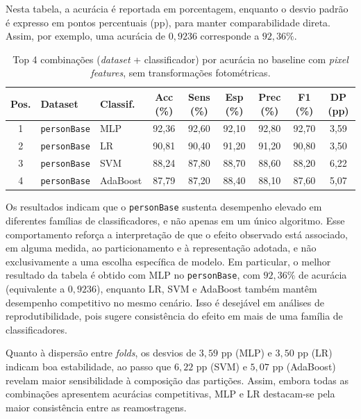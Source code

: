 \documentclass[11pt,a4paper]{article}
\begin{document}
Nesta tabela, a acurácia é reportada em porcentagem, enquanto o desvio padrão é expresso em pontos percentuais (pp), para manter comparabilidade direta. Assim, por exemplo, uma acurácia de \(0{,}9236\) corresponde a \(92{,}36\%\).

\begin{table}[htbp]
\centering
\caption{Top 4 combinações (\textit{dataset} + classificador) por acurácia no baseline com \emph{pixel features}, sem transformações fotométricas.}
\label{tab:feat-top4}
\scriptsize
\setlength{\tabcolsep}{3pt}
\renewcommand{\arraystretch}{1.12}
\begin{tabular}{cllcccccc}
\toprule
\textbf{Pos.} & \textbf{Dataset} & \textbf{Classif.} & \textbf{Acc (\%)} & \textbf{Sens (\%)} & \textbf{Esp (\%)} & \textbf{Prec (\%)} & \textbf{F1 (\%)} & \textbf{DP (pp)} \\
\midrule
1 & \texttt{personBase} & MLP      & 92,36 & 92,60 & 92,10 & 92,80 & 92,70 & 3,59 \\
2 & \texttt{personBase} & LR       & 90,81 & 90,40 & 91,20 & 91,20 & 90,80 & 3,50 \\
3 & \texttt{personBase} & SVM      & 88,24 & 87,80 & 88,70 & 88,60 & 88,20 & 6,22 \\
4 & \texttt{personBase} & AdaBoost & 87,79 & 87,20 & 88,40 & 88,10 & 87,60 & 5,07 \\
\bottomrule
\end{tabular}
\end{table}

Os resultados indicam que o \texttt{personBase} sustenta desempenho elevado em diferentes famílias de classificadores, e não apenas em um único algoritmo. Esse comportamento reforça a interpretação de que o efeito observado está associado, em alguma medida, ao particionamento e à representação adotada, e não exclusivamente a uma escolha específica de modelo. Em particular, o melhor resultado da tabela é obtido com MLP no \texttt{personBase}, com \(92{,}36\%\) de acurácia (equivalente a \(0{,}9236\)), enquanto LR, SVM e AdaBoost também mantêm desempenho competitivo no mesmo cenário. Isso é desejável em análises de reprodutibilidade, pois sugere consistência do efeito em mais de uma família de classificadores.

Quanto à dispersão entre \textit{folds}, os desvios de \(3{,}59\) pp (MLP) e \(3{,}50\) pp (LR) indicam boa estabilidade, ao passo que \(6{,}22\) pp (SVM) e \(5{,}07\) pp (AdaBoost) revelam maior sensibilidade à composição das partições. Assim, embora todas as combinações apresentem acurácias competitivas, MLP e LR destacam-se pela maior consistência entre as reamostragens.
\end{document}
